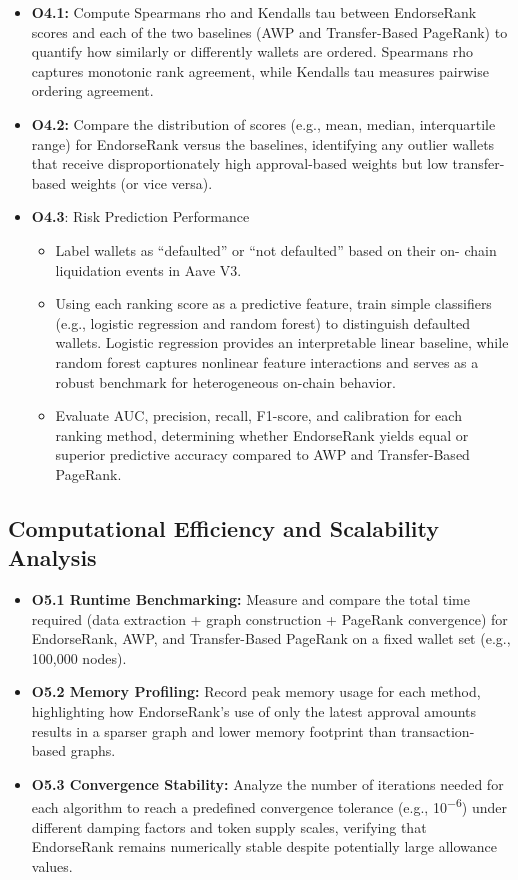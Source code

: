 \documentclass[
]{article}
\begin{document}
\begin{itemize}
\item
  \textbf{O4.1:} Compute Spearman\textquotesingle s rho and Kendall\textquotesingle s tau between EndorseRank scores and each of the two baselines (AWP and Transfer-Based PageRank) to quantify how similarly or differently wallets are ordered. Spearman\textquotesingle s rho captures monotonic rank agreement, while Kendall\textquotesingle s tau measures pairwise ordering agreement.
\item
  \textbf{O4.2:} Compare the distribution of scores (e.g., mean, median, interquartile range) for EndorseRank versus the baselines, identifying any outlier wallets that receive disproportionately high approval-based weights but low transfer-based weights (or vice versa).
\item
  \textbf{O4.3}: Risk Prediction Performance

  \begin{itemize}
  \item
    Label wallets as ``defaulted'' or ``not defaulted'' based on their on- chain liquidation events in Aave V3.
  \item
    Using each ranking score as a predictive feature, train simple classifiers (e.g., logistic regression and random forest) to distinguish defaulted wallets. Logistic regression provides an interpretable linear baseline, while random forest captures nonlinear feature interactions and serves as a robust benchmark for heterogeneous on-chain behavior.
  \item
    Evaluate AUC, precision, recall, F1-score, and calibration for each ranking method, determining whether EndorseRank yields equal or superior predictive accuracy compared to AWP and Transfer-Based PageRank.
  \end{itemize}
\end{itemize}

\subsection{Computational Efficiency and Scalability Analysis}\label{computational-efficiency-and-scalability-analysis}

\begin{itemize}
\item
  \textbf{O5.1 Runtime Benchmarking:} Measure and compare the total time required (data extraction + graph construction + PageRank convergence) for EndorseRank, AWP, and Transfer-Based PageRank on a fixed wallet set (e.g., 100,000 nodes).
\item
  \textbf{O5.2 Memory Profiling:} Record peak memory usage for each method, highlighting how EndorseRank's use of only the latest approval amounts results in a sparser graph and lower memory footprint than transaction- based graphs.
\item
  \textbf{O5.3 Convergence Stability:} Analyze the number of iterations needed for each algorithm to reach a predefined convergence tolerance (e.g., 10\textsuperscript{−6}) under different damping factors and token supply scales, verifying that EndorseRank remains numerically stable despite potentially large allowance values.
\end{itemize}
\end{document}
